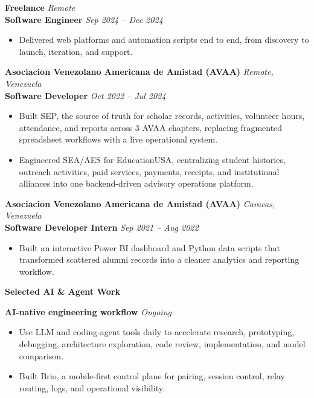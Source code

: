 \documentclass[11pt]{article}
\begin{document}
\textbf{Freelance} \hfill \textit{Remote} \\
\textbf{Software Engineer} \hfill \textit{Sep 2024 -- Dec 2024}
\begin{itemize}
    \item Delivered web platforms and automation scripts end to end, from discovery to launch, iteration, and support.
\end{itemize}
\vspace{8pt}
\textbf{Asociacion Venezolano Americana de Amistad (AVAA)} \hfill \textit{Remote, Venezuela} \\
\textbf{Software Developer} \hfill \textit{Oct 2022 -- Jul 2024}
\begin{itemize}
    \item Built SEP, the source of truth for scholar records, activities, volunteer hours, attendance, and reports across 3 AVAA chapters, replacing fragmented spreadsheet workflows with a live operational system.
    \item Engineered SEA/AES for EducationUSA, centralizing student histories, outreach activities, paid services, payments, receipts, and institutional alliances into one backend-driven advisory operations platform.
\end{itemize}
\vspace{8pt}
\textbf{Asociacion Venezolano Americana de Amistad (AVAA)} \hfill \textit{Caracas, Venezuela} \\
\textbf{Software Developer Intern} \hfill \textit{Sep 2021 -- Aug 2022}
\begin{itemize}
    \item Built an interactive Power BI dashboard and Python data scripts that transformed scattered alumni records into a cleaner analytics and reporting workflow.
\end{itemize}

\vspace{8pt}
\begin{center}
    \textbf{Selected AI \& Agent Work}
\end{center}
\vspace{-4pt}
\textbf{AI-native engineering workflow} \hfill \textit{Ongoing}
\begin{itemize}
    \item Use LLM and coding-agent tools daily to accelerate research, prototyping, debugging, architecture exploration, code review, implementation, and model comparison.
    \item Built Brio, a mobile-first control plane for pairing, session control, relay routing, logs, and operational visibility.
\end{itemize}
\end{document}
